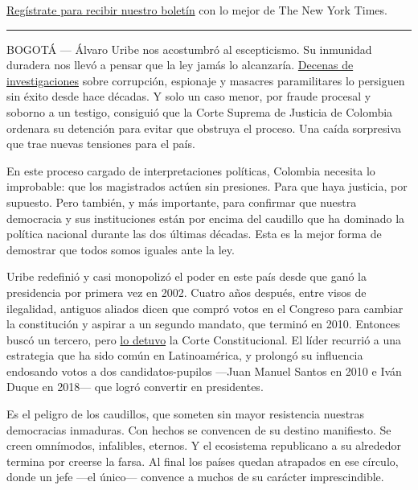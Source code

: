 \href{https://www.nytimes3xbfgragh.onion/newsletters/el-times}{Regístrate
para recibir nuestro boletín} con lo mejor de The New York Times.

\begin{center}\rule{0.5\linewidth}{\linethickness}\end{center}

BOGOTÁ --- Álvaro Uribe nos acostumbró al escepticismo. Su inmunidad
duradera nos llevó a pensar que la ley jamás lo alcanzaría.
\href{https://www.semana.com/nacion/articulo/procesos-judiciales-en-contra-de-alvaro-uribe-velez/691746}{Decenas
de investigaciones} sobre corrupción, espionaje y masacres paramilitares
lo persiguen sin éxito desde hace décadas. Y solo un caso menor, por
fraude procesal y soborno a un testigo, consiguió que la Corte Suprema
de Justicia de Colombia ordenara su detención para evitar que obstruya
el proceso. Una caída sorpresiva que trae nuevas tensiones para el país.

En este proceso cargado de interpretaciones políticas, Colombia necesita
lo improbable: que los magistrados actúen sin presiones. Para que haya
justicia, por supuesto. Pero también, y más importante, para confirmar
que nuestra democracia y sus instituciones están por encima del caudillo
que ha dominado la política nacional durante las dos últimas décadas.
Esta es la mejor forma de demostrar que todos somos iguales ante la ley.

Uribe redefinió y casi monopolizó el poder en este país desde que ganó
la presidencia por primera vez en 2002. Cuatro años después, entre visos
de ilegalidad, antiguos aliados dicen que compró votos en el Congreso
para cambiar la constitución y aspirar a un segundo mandato, que terminó
en 2010. Entonces buscó un tercero, pero
\href{https://www.eltiempo.com/archivo/documento/CMS-7304227}{lo detuvo}
la Corte Constitucional. El líder recurrió a una estrategia que ha sido
común en Latinoamérica, y prolongó su influencia endosando votos a dos
candidatos-pupilos ---Juan Manuel Santos en 2010 e Iván Duque en 2018---
que logró convertir en presidentes.

Es el peligro de los caudillos, que someten sin mayor resistencia
nuestras democracias inmaduras. Con hechos se convencen de su destino
manifiesto. Se creen omnímodos, infalibles, eternos. Y el ecosistema
republicano a su alrededor termina por creerse la farsa. Al final los
países quedan atrapados en ese círculo, donde un jefe ---el único---
convence a muchos de su carácter imprescindible.

